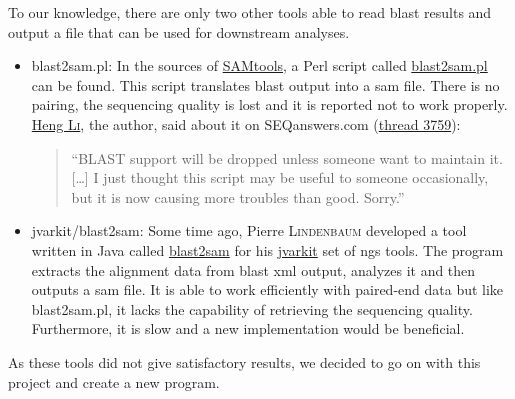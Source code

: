 To our knowledge, there are only two other tools able to read \gls{blast} results and output a file that can be used for downstream analyses.
\begin{itemize}
    \item blast2sam.pl:
    In the sources of \href{http://www.htslib.org/}{SAMtools}, a Perl script called \href{https://github.com/samtools/samtools/blob/develop/misc/blast2sam.pl}{blast2sam.pl} can be found.
    This script translates \gls{blast} output into a \acrshort{sam} file. There is no pairing, the sequencing quality is lost and it is reported not to work properly.
    \href{http://lh3lh3.users.sourceforge.net/}{Heng \textsc{Li}}, the author, said about it on SEQanswers.com (\href{http://seqanswers.com/forums/showthread.php?t=3759}{thread 3759}):
    \begin{quote}
    ``BLAST support will be dropped unless someone want to maintain it. [\ldots] I just thought this script may be useful to someone occasionally, but it is now causing more troubles than good. Sorry.''
    \end{quote}
    \item jvarkit/blast2sam:
    Some time ago, Pierre \textsc{Lindenbaum} developed a tool written in Java called \href{https://github.com/lindenb/jvarkit/blob/master/src/main/java/com/github/lindenb/jvarkit/tools/blast2sam/BlastToSam.java}{blast2sam} for his \href{https://github.com/lindenb/jvarkit}{jvarkit} set of \gls{ngs} tools.
    The program extracts the alignment data from \gls{blast} \acrshort{xml} output, analyzes it and then outputs a \acrshort{sam} file.
    It is able to work efficiently with paired-end data but like blast2sam.pl, it lacks the capability of retrieving the sequencing quality.
    Furthermore, it is slow and a new implementation would be beneficial.
\end{itemize}

As these tools did not give satisfactory results, we decided to go on with this project and create a new program.
